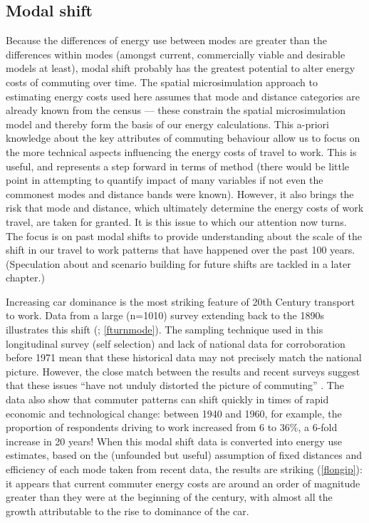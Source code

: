 \subsection{Modal shift}
Because the differences of energy use between modes are greater than the
differences within modes (amongst current, commercially viable and desirable
models at least),
modal shift probably has the greatest potential to alter energy costs of commuting
over time. The spatial microsimulation approach to estimating energy costs used
here assumes that mode and distance categories are already known from the
census --- these constrain the spatial microsimulation model and thereby form
the basis of our energy calculations. This a-priori knowledge about the key attributes
of commuting behaviour allow us to focus on the more technical aspects influencing
the energy costs of travel to work. This is useful, and represents a step forward
in terms of method (there would be little point in attempting to quantify
impact of many variables if not even the commonest modes and distance bands
were known). However, it also brings the risk that mode and distance, which ultimately
determine the energy costs of work travel, are taken for granted.
It is this issue to which our attention now turns. The focus is on past modal
shifts  to provide understanding about the scale of the
shift in our travel to work patterns that have happened over the past 100 years.
(Speculation about and scenario building for future shifts are tackled
in a later chapter.)

Increasing car dominance is the most striking feature of 20th Century transport
to work. Data from a large (n=1010) survey extending back to the 1890s
illustrates this shift (\citealp{Turnbull2000}; \cref{fturnmode}).
The sampling technique used in
this longitudinal survey (self selection) and lack of national data for
corroboration before 1971 mean that these historical data may not precisely
match the national picture. However, the close match between the results and
recent surveys suggest that these issues ``have not unduly distorted the picture
of commuting'' \citep[p.~13]{Turnbull2000}⁠.  The data also show that commuter patterns can
shift quickly in times of rapid economic and technological change: between 1940
and 1960, for example, the proportion of respondents  driving to work increased
from 6 to 36\%, a 6-fold increase in 20 years! When this modal shift data is
converted into energy use estimates, based on the (unfounded but useful)
assumption of fixed distances and efficiency of each mode taken from recent
data, the results are striking (\cref{flongip}): it appears that current
commuter energy costs are around an order of magnitude greater than they were
at the beginning of the century, with almost all the growth attributable to
the rise to dominance of the car.

